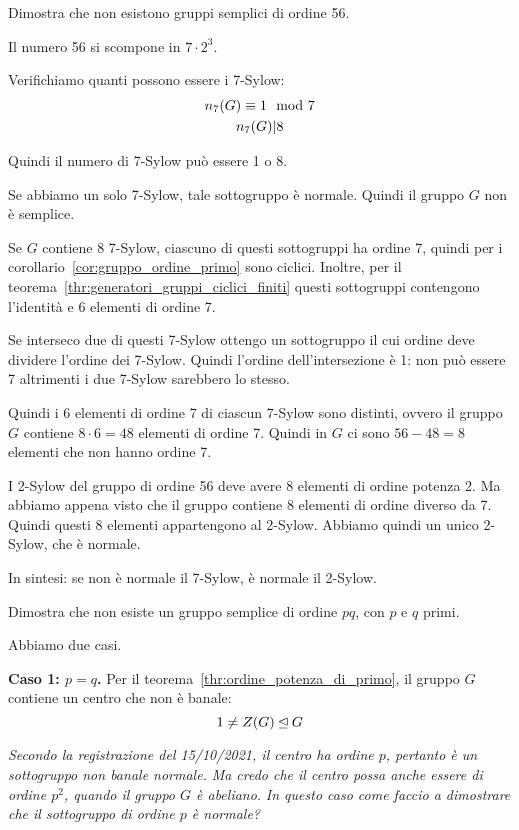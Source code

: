 \begin{esercizio}
    Dimostra che non esistono gruppi semplici di ordine 56.
\end{esercizio}
\begin{soluzione}
    Il numero 56 si scompone in $7 \cdot 2^3$.

    Verifichiamo quanti possono essere i 7-Sylow:
    \begin{gather*}
        n_7(G) \equiv 1 \mod 7 \\
        n_7(G) | 8
    \end{gather*}

    Quindi il numero di 7-Sylow può essere 1 o 8.

    Se abbiamo un solo 7-Sylow, tale sottogruppo è normale. Quindi il gruppo $G$ non è semplice.

    Se $G$ contiene 8 7-Sylow, ciascuno di questi sottogruppi ha ordine 7, quindi per i corollario~\ref{cor:gruppo_ordine_primo} sono ciclici.
    Inoltre, per il teorema~\ref{thr:generatori_gruppi_ciclici_finiti} questi sottogruppi contengono l'identità e
    6 elementi di ordine 7.

    Se interseco due di questi 7-Sylow ottengo un sottogruppo il cui ordine deve dividere l'ordine dei 7-Sylow.
    Quindi l'ordine dell'intersezione è 1: non può essere 7 altrimenti i due 7-Sylow sarebbero lo stesso.

    Quindi i 6 elementi di ordine 7 di ciascun 7-Sylow sono distinti, ovvero il gruppo $G$ contiene $8 \cdot 6 = 48$
    elementi di ordine 7.
    Quindi in $G$ ci sono $56-48 = 8$ elementi che non hanno ordine 7.

    I 2-Sylow del gruppo di ordine 56 deve avere 8 elementi di ordine potenza 2.
    Ma abbiamo appena visto che il gruppo contiene 8 elementi di ordine diverso da 7.
    Quindi questi 8 elementi appartengono al 2-Sylow.
    Abbiamo quindi un unico 2-Sylow, che è normale.

    In sintesi: se non è normale il 7-Sylow, è normale il 2-Sylow.
\end{soluzione}

\begin{esercizio}
    Dimostra che non esiste un gruppo semplice di ordine $pq$, con $p$ e $q$ primi.
\end{esercizio}
\begin{soluzione}
    Abbiamo due casi.

    \bigskip
    \textbf{Caso 1: $p = q$.}
    Per il teorema~\ref{thr:ordine_potenza_di_primo}, il gruppo $G$ contiene un centro che non è banale:
    \begin{equation*}
        1 \ne Z(G) \unlhd G
    \end{equation*}

    \emph{Secondo la registrazione del 15/10/2021, il centro ha ordine $p$, pertanto è un sottogruppo non banale normale.}
    \emph{Ma credo che il centro possa anche essere di ordine $p^2$, quando il gruppo $G$ è abeliano.}
    \emph{In questo caso come faccio a dimostrare che il sottogruppo di ordine $p$ è normale?}
\end{soluzione}